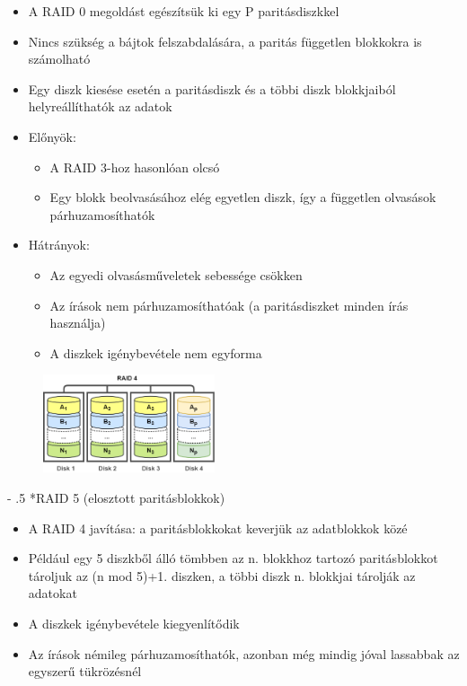 \documentclass[tikz,12pt,margin=0px]{article}
\makeatletter
\renewcommand\paragraph{%
	\@startsection{paragraph}{4}{0mm}%
	{-\baselineskip}%
	{.5\baselineskip}%
	{\normalfont\normalsize\bfseries}}
\makeatother
\begin{document}
    \begin{itemize}[topsep=8pt,itemsep=4pt,partopsep=4pt, parsep=4pt]
        \item  A RAID 0 megoldást egészítsük ki egy P paritásdiszkkel
        \item Nincs szükség a bájtok felszabdalására, a paritás független blokkokra is számolható
        \item Egy diszk kiesése esetén a paritásdiszk és a többi diszk blokkjaiból helyreállíthatók az adatok

        \item Előnyök:
        \begin{itemize}
            \item A RAID 3-hoz hasonlóan olcsó
            \item Egy blokk beolvasásához elég egyetlen diszk, így a független olvasások párhuzamosíthatók
        \end{itemize}
        \item Hátrányok:
        \begin{itemize}
            \item Az egyedi olvasásműveletek sebessége csökken
            \item Az írások nem párhuzamosíthatóak (a paritásdiszket minden írás használja)
            \item A diszkek igénybevétele nem egyforma
        \end{itemize}
    \end{itemize}

    \begin{figure}[H]
        \centering
        \includegraphics[width=0.45\textwidth]{img/raid4.png}
        \label{ref:raid4}
    \end{figure}

	\paragraph*{RAID 5 (elosztott paritásblokkok)}

    \begin{itemize}[topsep=8pt,itemsep=4pt,partopsep=4pt, parsep=4pt]
        \item A RAID 4 javítása: a paritásblokkokat keverjük az adatblokkok közé
        \item Például egy 5 diszkből álló tömbben az n. blokkhoz tartozó paritásblokkot tároljuk az (n mod 5)+1. diszken, a többi diszk n. blokkjai tárolják az adatokat
        \item A diszkek igénybevétele kiegyenlítődik
        \item Az írások némileg párhuzamosíthatók, azonban még mindig jóval lassabbak az egyszerű tükrözésnél
    \end{itemize}
\end{document}
